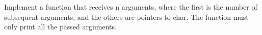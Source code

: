  
Implement a function that receives n arguments,
where the first is the number of subsequent arguments,
and the others are pointers to char.
The function must only print all the passed arguments.
